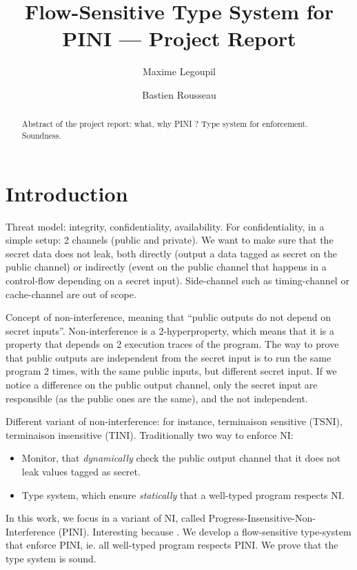 \documentclass[10pt]{article}
\title{
   Flow-Sensitive Type System for PINI --- Project Report
}
\author{Maxime Legoupil \and Bastien Rousseau }
\begin{document}
\maketitle

\begin{abstract}
   Abstract of the project report: what, why PINI ? Type system for enforcement. Soundness.
\end{abstract}

\thispagestyle{empty}

\section{Introduction}
\label{sec:intro}

Threat model: integrity, confidentiality, availability. For confidentiality, in a simple setup: 2
channels (public and private). We want to make sure that the secret data does not leak, both
directly (output a data tagged as secret on the public channel) or indirectly (event on the public
channel that happens in a control-flow depending on a secret input).
Side-channel such as timing-channel or cache-channel are out of scope.

Concept of non-interference, meaning that ``public outputs do not depend on secret inputs''.
Non-interference is a 2-hyperproperty, which means that it is a property that depends on 2
execution traces of the program. The way to prove that public outputs are independent from the
secret input is to run the same program 2 times, with the same public inputs, but different secret
input. If we notice a difference on the public output channel, only the secret input are responsible
(as the public ones are the same), and the not independent.

Different variant of non-interference: for instance, terminaison sensitive (TSNI), terminaison insensitive
(TINI).
Traditionally two way to enforce NI:
\begin{itemize}
  \item Monitor, that \emph{dynamically} check the public output channel that it does not leak
        values tagged as secret.
  \item Type system, which ensure \emph{statically} that a well-typed program respects NI.
\end{itemize}


In this work, we focus in a variant of NI, called Progress-Insensitive-Non-Interference (PINI).
Interesting because .
We develop a flow-sensitive type-system that enforce PINI, ie. all well-typed program respects PINI.
We prove that the type system is sound.
\end{document}
